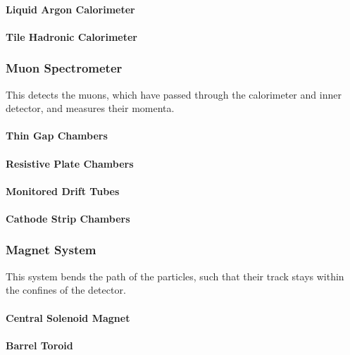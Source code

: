 \documentclass[11pt,a4paper]{article}
\begin{document}
\paragraph{Liquid Argon Calorimeter}
\paragraph{Tile Hadronic Calorimeter}

\subsubsection{Muon Spectrometer}
This detects the muons, which have passed through the calorimeter and inner
detector, and measures their momenta.

\paragraph{Thin Gap Chambers}
\paragraph{Resistive Plate Chambers}
\paragraph{Monitored Drift Tubes}
\paragraph{Cathode Strip Chambers}

\subsubsection{Magnet System}
This system bends the path of the particles, such that their track stays within
the confines of the detector.

\paragraph{Central Solenoid Magnet}
\paragraph{Barrel Toroid}
\end{document}
